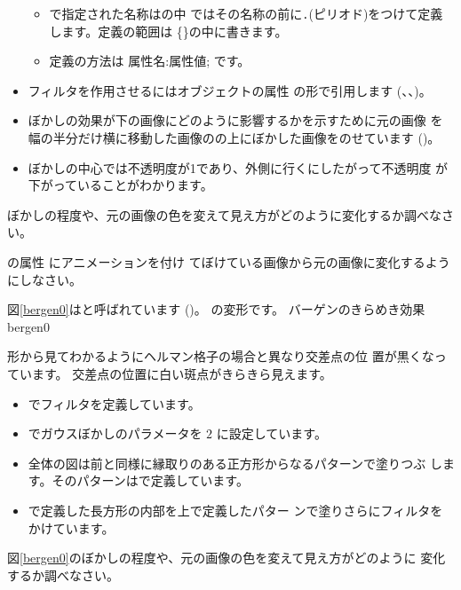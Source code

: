 \begin{itemize}
\begin{itemize}
 \item {}で指定された名称はの中
 ではその名称の前に\texttt{.}(ピリオド)をつけて定義します。定義の範囲は
 \{\}の中に書きます。
 \item 定義の方法は 属性名:属性値; です。
\end{itemize}
 \item フィルタを作用させるにはオブジェクトの属性
 の形で引用します
    (、、)。
 \item ぼかしの効果が下の画像にどのように影響するかを示すために元の画像
 を幅の半分だけ横に移動した画像のの上にぼかした画像をのせています
       ()。
 \item ぼかしの中心では不透明度が1であり、外側に行くにしたがって不透明度
 が下がっていることがわかります。
\end{itemize}
\begin{Problem}
ぼかしの程度や、元の画像の色を変えて見え方がどのように変化するか調べなさ
 い。
\end{Problem}
\begin{Problem}
 の属性 にアニメーションを付け
 てぼけている画像から元の画像に変化するようにしなさい。
\end{Problem}
図\ref{bergen0}はと呼ばれています
(\cite[182ページ図17.1]{Ninio})。
の変形です。
    {バーゲンのきらめき効果}{bergen0}

形から見てわかるようにヘルマン格子の場合と異なり交差点の位
置が黒くなっています。
交差点の位置に白い斑点がきらきら見えます。
\begin{itemize}
 \item {}でフィルタを定義しています。
 \item {}でガウスぼかしのパラメータを $2$ に設定しています。
 \item 全体の図は前と同様に縁取りのある正方形からなるパターンで塗りつぶ
       します。そのパターンはで定義しています。
 \item {}で定義した長方形の内部を上で定義したパター
       ンで塗りさらにフィルタをかけています。
\end{itemize}
\begin{Problem}\upshape
図\ref{bergen0}のぼかしの程度や、元の画像の色を変えて見え方がどのように
 変化するか調べなさい。
\end{Problem}

